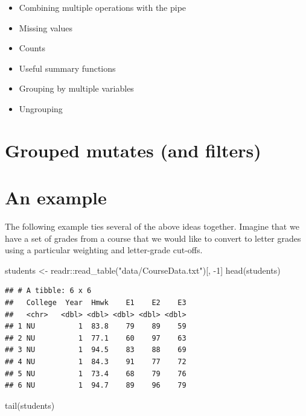 \documentclass[
]{book}
\newenvironment{Shaded}{\begin{snugshade}}{\end{snugshade}}
\newcommand{\DecValTok}[1]{\textcolor[rgb]{0.00,0.00,0.81}{#1}}
\newcommand{\FunctionTok}[1]{\textcolor[rgb]{0.00,0.00,0.00}{#1}}
\newcommand{\NormalTok}[1]{#1}
\newcommand{\OtherTok}[1]{\textcolor[rgb]{0.56,0.35,0.01}{#1}}
\newcommand{\SpecialCharTok}[1]{\textcolor[rgb]{0.00,0.00,0.00}{#1}}
\newcommand{\StringTok}[1]{\textcolor[rgb]{0.31,0.60,0.02}{#1}}
\providecommand{\tightlist}{%
  \setlength{\itemsep}{0pt}\setlength{\parskip}{0pt}}
\begin{document}
\begin{itemize}
\tightlist
\item
  Combining multiple operations with the pipe
\item
  Missing values
\item
  Counts
\item
  Useful summary functions
\item
  Grouping by multiple variables
\item
  Ungrouping
\end{itemize}

\hypertarget{grouped-mutates-and-filters}{%
\section{Grouped mutates (and filters)}\label{grouped-mutates-and-filters}}

\hypertarget{an-example}{%
\section{An example}\label{an-example}}

The following example ties several of the above ideas together. Imagine that we have a set of grades from a course that we would like to convert to letter grades using a particular weighting and letter-grade cut-offs.

\begin{Shaded}
\begin{Highlighting}[]
\NormalTok{students }\OtherTok{\textless{}{-}}\NormalTok{ readr}\SpecialCharTok{::}\FunctionTok{read\_table}\NormalTok{(}\StringTok{"data/CourseData.txt"}\NormalTok{)[, }\SpecialCharTok{{-}}\DecValTok{1}\NormalTok{]}
\FunctionTok{head}\NormalTok{(students)}
\end{Highlighting}
\end{Shaded}

\begin{verbatim}
## # A tibble: 6 x 6
##   College  Year  Hmwk    E1    E2    E3
##   <chr>   <dbl> <dbl> <dbl> <dbl> <dbl>
## 1 NU          1  83.8    79    89    59
## 2 NU          1  77.1    60    97    63
## 3 NU          1  94.5    83    88    69
## 4 NU          1  84.3    91    77    72
## 5 NU          1  73.4    68    79    76
## 6 NU          1  94.7    89    96    79
\end{verbatim}

\begin{Shaded}
\begin{Highlighting}[]
\FunctionTok{tail}\NormalTok{(students)}
\end{Highlighting}
\end{Shaded}
\end{document}
